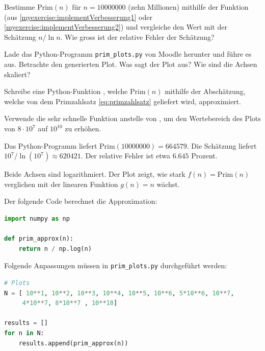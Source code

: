 	\begin{myexercise}
		\begin{aenum}
			\item Bestimme $\text{Prim}(n)$ für $n = 10000000$ (zehn Millionen) mithilfe der Funktion  (aus \cref{myexercise:implementVerbesserung1} oder \cref{myexercise:implementVerbesserung2}) und vergleiche den Wert mit der Schätzung $n/\ln{n}$.
			Wie gross ist der relative Fehler der Schätzung?

			\item Lade das Python-Programm {\tt prim\_plots.py} von Moodle herunter und führe es aus. Betrachte den generierten Plot. Was sagt der Plot aus? Wie sind die Achsen skaliert?

			\item Schreibe eine Python-Funktion , welche $\text{Prim}(n)$ mithilfe der Abschätzung, welche von dem Primzahlsatz \ref{eq:primzahlsatz} geliefert wird, approximiert.

			\item Verwende die sehr schnelle Funktion  anstelle von , um den Wertebereich des Plots von $8\cdot 10^7$ auf $10^{10}$ zu erhöhen.
		\end{aenum}
		\begin{myanswer}
			\begin{aenum}
				\item Das Python-Programm liefert $\text{Prim}(10000000) = 664579$. Die Schätzung liefert $10^7/\ln{(10^7)}\approx 620421$. Der relative Fehler ist etwa $6.645$ Prozent.

				\item Beide Achsen sind logarithmiert. Der Plot zeigt, wie stark $f(n) = \text{Prim}(n)$ verglichen mit der linearen Funktion $g(n) = n$ wächst.

				\item Der folgende Code berechnet die Approximation:

				\begin{lstlisting}[language=Python,numbers=none]
import numpy as np

def prim_approx(n):
    return n / np.log(n)
\end{lstlisting}
				\item
				Folgende Anpassungen müssen in {\tt prim\_plots.py} durchgeführt werden:
				\begin{lstlisting}[language=Python,numbers=none]
# Plots
N = [ 10**1, 10**2, 10**3, 10**4, 10**5, 10**6, 5*10**6, 10**7,
     4*10**7, 8*10**7 , 10**10]

results = []
for n in N:
    results.append(prim_approx(n))
\end{lstlisting}
			\end{aenum}
		\end{myanswer}
	\end{myexercise}


